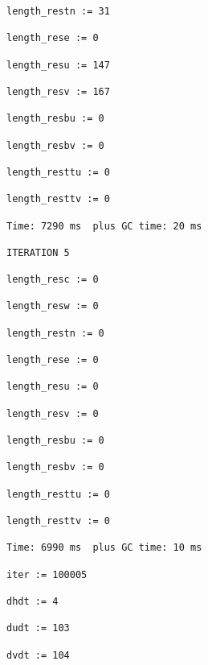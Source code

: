 \documentclass[12pt,a5paper]{article}
\begin{document}
\begin{verbatim}
length_restn := 31

length_rese := 0

length_resu := 147

length_resv := 167

length_resbu := 0

length_resbv := 0

length_resttu := 0

length_resttv := 0

Time: 7290 ms  plus GC time: 20 ms

ITERATION 5

length_resc := 0

length_resw := 0

length_restn := 0

length_rese := 0

length_resu := 0

length_resv := 0

length_resbu := 0

length_resbv := 0

length_resttu := 0

length_resttv := 0

Time: 6990 ms  plus GC time: 10 ms

iter := 100005

dhdt := 4

dudt := 103

dvdt := 104
\end{verbatim}






\end{document}
